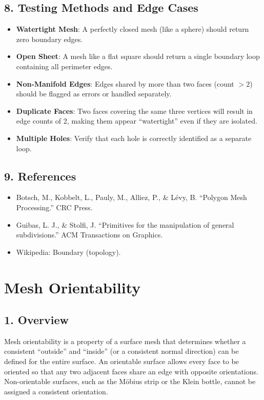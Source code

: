 \subsection{8. Testing Methods and Edge Cases}

\begin{itemize}
    \item \textbf{Watertight Mesh}: A perfectly closed mesh (like a sphere) should return zero boundary edges.
    \item \textbf{Open Sheet}: A mesh like a flat square should return a single boundary loop containing all perimeter edges.
    \item \textbf{Non-Manifold Edges}: Edges shared by more than two faces (count $> 2$) should be flagged as errors or handled separately.
    \item \textbf{Duplicate Faces}: Two faces covering the same three vertices will result in edge counts of 2, making them appear ``watertight'' even if they are isolated.
    \item \textbf{Multiple Holes}: Verify that each hole is correctly identified as a separate loop.
\end{itemize}

\subsection{9. References}

\begin{itemize}
    \item Botsch, M., Kobbelt, L., Pauly, M., Alliez, P., \& L\'evy, B. \cite{botsch2010} ``Polygon Mesh Processing.'' CRC Press.
    \item Guibas, L. J., \& Stolfi, J. \cite{guibas1985} ``Primitives for the manipulation of general subdivisions.'' ACM Transactions on Graphics.
    \item Wikipedia: Boundary (topology).
\end{itemize}

\section{Mesh Orientability}
\label{sec:mesh_orientability}

\subsection{1. Overview}

Mesh orientability is a property of a surface mesh that determines whether a consistent ``outside'' and ``inside'' (or a consistent normal direction) can be defined for the entire surface. An orientable surface allows every face to be oriented so that any two adjacent faces share an edge with opposite orientations. Non-orientable surfaces, such as the M\"obius strip or the Klein bottle, cannot be assigned a consistent orientation\cite{botsch2010}.

